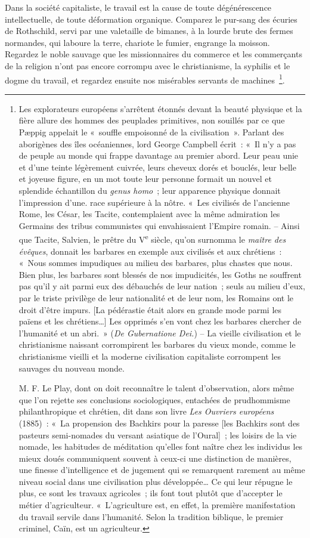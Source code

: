 \documentclass[french,twoside]{book} %
\begin{document}
Dans la société capitaliste, le travail est la cause de toute dégénérescence intellectuelle, de toute déformation organique. Comparez le pur-sang des écuries de Rothschild, servi par une valetaille de bimanes, à la lourde brute des fermes normandes, qui laboure la terre, chariote le fumier, engrange la moisson. Regardez le noble sauvage que les missionnaires du commerce et les commerçants de la religion n’ont pas encore corrompu avec le christianisme, la syphilis et le dogme du travail, et regardez ensuite nos misérables servants de machines \footnote{ \noindent Les explorateurs européens s’arrêtent étonnés devant la beauté physique et la fière allure des hommes des peuplades primitives, non souillés par ce que Pæppig appelait le « souffle empoisonné de la civilisation ». Parlant des aborigènes des îles océaniennes, lord George Campbell écrit : « Il n’y a pas de peuple au monde qui frappe davantage au premier abord. Leur peau unie et d’une teinte légèrement cuivrée, leurs cheveux dorés et bouclés, leur belle et joyeuse figure, en un mot toute leur personne formait un nouvel et splendide échantillon du \emph{genus homo} ; leur apparence physique donnait l’impression d’une. race supérieure à la nôtre. « Les civilisés de l’ancienne Rome, les César, les Tacite, contemplaient avec la même admiration les Germains des tribus communistes qui envahissaient l’Empire romain. – Ainsi que Tacite, Salvien, le prêtre du V\textsuperscript{e} siècle, qu’on surnomma le \emph{maître des évêques}, donnait les barbares en exemple aux civilisés et aux chrétiens : « Nous sommes impudiques au milieu des barbares, plus chastes que nous. Bien plus, les barbares sont blessés de nos impudicités, les Goths ne souffrent pas qu’il y ait parmi eux des débauchés de leur nation ; seuls au milieu d’eux, par le triste privilège de leur nationalité et de leur nom, les Romains ont le droit d’être impurs. [La pédérastie était alors en grande mode parmi les païens et les chrétiens…] Les opprimés s’en vont chez les barbares chercher de l’humanité et un abri. » (\emph{De Gubernatione Dei.}) – La vieille civilisation et le christianisme naissant corrompirent les barbares du vieux monde, comme le christianisme vieilli et la moderne civilisation capitaliste corrompent les sauvages du nouveau monde.\par
 M. F. Le Play, dont on doit reconnaître le talent d’observation, alors même que l’on rejette ses conclusions sociologiques, entachées de prudhommisme philanthropique et chrétien, dit dans son livre \emph{Les Ouvriers européens} (1885) : « La propension des Bachkirs pour la paresse [les Bachkirs sont des pasteurs semi-nomades du versant asiatique de l’Oural] ; les loisirs de la vie nomade, les habitudes de méditation qu’elles font naître chez les individus les mieux doués communiquent souvent à ceux-ci une distinction de manières, une finesse d’intelligence et de jugement qui se remarquent rarement au même niveau social dans une civilisation plus développée… Ce qui leur répugne le plus, ce sont les travaux agricoles ; ils font tout plutôt que d’accepter le métier d’agriculteur. « L’agriculture est, en effet, la première manifestation du travail servile dans l’humanité. Selon la tradition biblique, le premier criminel, Caïn, est un agriculteur.
}.\par
\end{document}
